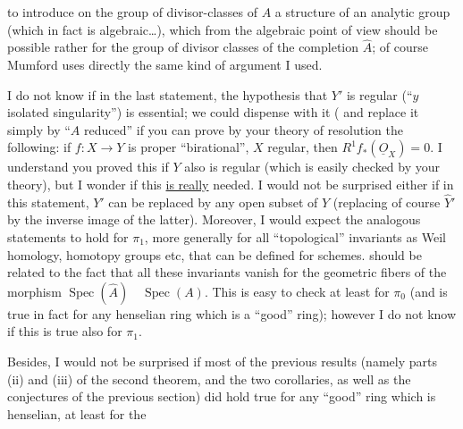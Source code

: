 
 to introduce  on the group of divisor-classes of $A$ a structure of an analytic group (which in fact is algebraic\ldots), which from the algebraic point of view should be possible rather for the group of divisor classes of the completion $\widehat{A}$; of course Mumford uses directly the same kind of argument I used.

I do not know if in the last statement, the hypothesis that $Y'$ is regular (``$y$ isolated singularity'') is essential; we could dispense with it ( and replace it simply by ``$A$ reduced'' if you can prove by your theory of resolution the following: if $f:X\rightarrow Y$ is proper ``birational'', $X$ regular, then $R^1f_*(\underline{O}_X)=0$. I understand you proved this if $Y$ also is regular (which is easily checked by your theory), but I wonder if this \uline{is really} needed. I would not be surprised either if in this statement, $Y'$ can be replaced by any open subset of $Y$ (replacing of course $\widehat{Y}'$ by the inverse image of the latter). Moreover, I would expect the analogous statements to hold for $\pi_1$, more generally for all ``topological'' invariants as Weil homology, homotopy groups etc, that can be defined for schemes.  should be related to the fact that all these invariants vanish for the geometric fibers of the morphism $\operatorname{Spec}(\widehat{A})\quad\operatorname{Spec}(A)$. This is easy to check at least for $\pi_0$ (and is true in fact for any henselian ring which is a ``good'' ring); however I do not know if this is true also for $\pi_1$.

Besides, I would not be surprised if most of the previous results (namely parts (ii) and (iii) of the second theorem, and the two corollaries, as well as the  conjectures of the previous section) did hold true for any ``good'' ring which is henselian,  at least for the

